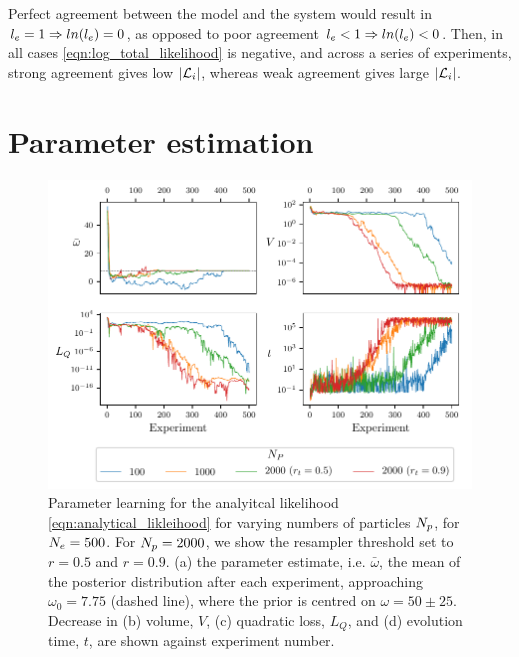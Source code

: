 Perfect agreement between the model and the system would result in $l_{e}=1 \Rightarrow ln(l_{e})=0$, 
    as opposed to poor agreement $l_{e} < 1 \Rightarrow ln(l_{e}) < 0$.
Then, in all cases \cref{eqn:log_total_likelihood} is negative, 
    and across a series of experiments,
    strong agreement gives low $\left| {\mathcal{L}}_{i} \right| $, 
    whereas weak agreement gives large $\left| {\mathcal{L}}_{i} \right| $. 


\section{Parameter estimation}

\begin{figure}[t]
    \centering
    \includegraphics{figure_development/params.pdf}
    \caption[Parameter learning varying number of particles]{
        Parameter learning for the analyitcal likelihood \cref{eqn:analytical_likleihood}
        for varying numbers of particles $N_p$, for $N_e=500$. 
        For $N_p=2000$, we show the resampler threshold set to $r=0.5$ and $r=0.9$. 
        (a) the parameter estimate, i.e. $\bar{\omega}$, the mean of the posterior distribution after each experiment, 
        approaching $\omega_0=7.75$ (dashed line), where the prior is centred on $\omega=50 \pm 25$. 
        Decrease in (b) volume, $V$, (c) quadratic loss, $L_Q$, 
        and (d) evolution time, $t$, are shown against experiment number.
    }
    \label{fig:param_learning_vary_particles}
\end{figure}


